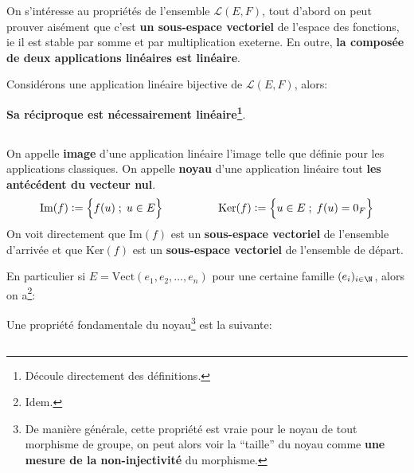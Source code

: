 On s'intéresse au propriétés de l'ensemble \(\mathcal{L}(E, F)\), tout d'abord on peut prouver aisément que c'est \textbf{un sous-espace vectoriel} de l'espace des fonctions, ie il est stable par somme et par multiplication exeterne.\+
En outre, \textbf{la composée de deux applications linéaires est linéaire}.\<

Considérons une application linéaire bijective de \(\mathcal{L}(E, F)\), alors:
\begin{center}
   \textbf{Sa réciproque est nécessairement linéaire\footnote[3]{Découle directement des définitions.}}.
\end{center}

\subsection*{}

On appelle \textbf{image} d'une application linéaire l'image telle que définie pour les applications classiques.\+
On appelle \textbf{noyau} d'une application linéaire tout \textbf{les antécédent du vecteur nul}.\+
\[
   \text{Im}(f) := \Bigl\{ f(u) \; ; \; u \in E \Bigl\}
   \quad\quad\quad\quad\quad
   \text{Ker}(f) := \Bigl\{ u \in E \; ; \; f(u) = 0_F \Bigl\}
\]
On voit directement que \(\text{Im}(f)\) est un \textbf{sous-espace vectoriel} de l'ensemble d'arrivée et que \(\text{Ker}(f)\) est un \textbf{sous-espace vectoriel} de l'ensemble de départ.\<

En particulier si \(E = \text{Vect}(e_1, e_2, \ldots, e_n)\) pour une certaine famille \((e_i)_{i\in \N}\), alors on a\footnote[5]{Idem.}:

Une propriété fondamentale du noyau\footnote[6]{De manière générale, cette propriété est vraie pour le noyau de tout morphisme de groupe, on peut alors voir la ``taille'' du noyau comme \textbf{une mesure de la non-injectivité} du morphisme.} est la suivante:
\pagebreak

\subsection*{}

